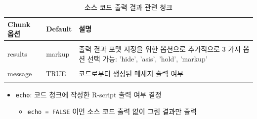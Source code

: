 \documentclass[
  11pt,
]{krantz}
\providecommand{\tightlist}{%
  \setlength{\itemsep}{0pt}\setlength{\parskip}{0pt}}
\begin{document}
\begin{table}[H]

\caption{\label{tab:chunk-tab-02}소스 코드 출력 결과 관련 청크}
\centering
\fontsize{11}{13}\selectfont
\begin{tabular}[t]{>{\raggedright\arraybackslash}p{3cm}>{\raggedright\arraybackslash}p{3cm}>{\raggedright\arraybackslash}p{8cm}}
\toprule
Chunk 옵션 & Default & 설명\\
\midrule
\cellcolor{gray!6}{echo} & \cellcolor{gray!6}{TRUE} & \cellcolor{gray!6}{R 실행 결과에 대응하는 코드 출력 여부}\\
results & markup & 출력 결과 포맷 지정을 위한 옵션으로 추가적으로 3 가지 옵션 선택 가능: 'hide', 'asis', 'hold', 'markup'\\
\cellcolor{gray!6}{error} & \cellcolor{gray!6}{TRUE} & \cellcolor{gray!6}{코드 또는 스크립트에 구문오류 메세지 출력 여부}\\
message & TRUE & 코드로부터 생성된 메세지 출력 여부\\
\cellcolor{gray!6}{warning} & \cellcolor{gray!6}{TRUE} & \cellcolor{gray!6}{경고 메세지 출력 여부}\\
\bottomrule
\end{tabular}
\end{table}

\normalsize

\begin{itemize}
\tightlist
\item
  \texttt{echo}: 코드 청크에 작성한 R-script 출력 여부 결정

  \begin{itemize}
  \tightlist
  \item
    \texttt{echo\ =\ FALSE} 이면 소스 코드 출력 없이 그림 결과만 출력
  \end{itemize}
\end{itemize}
\end{document}
